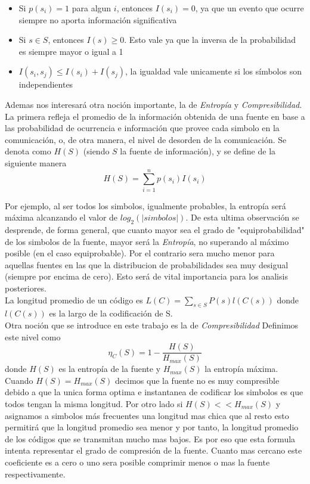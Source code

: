 \begin{itemize}
	\item Si $p(s_i) = 1$ para algun $i$, entonces $I(s_i) = 0$, ya que un evento que ocurre siempre no aporta información significativa
	\item Si $s \in S$, entonces $I(s) \geq 0$. Esto vale ya que la inversa de la probabilidad es siempre mayor o igual a 1
	\item $I(s_i, s_j) \leq I(s_i) + I(s_j)$, la igualdad vale unicamente si los símbolos son independientes
	
\end{itemize}

Ademas nos interesará otra noción importante, la de \textit{Entropía} y \textit{Compresibilidad}. La
primera refleja el promedio de la información obtenida de una fuente en
base a las probabilidad de ocurrencia e información que provee cada simbolo en la
comunicación, o, de otra manera, el nivel de desorden de la comunicación.
Se denota como $H(S)$ (siendo $S$ la fuente de información), y se
define de la siguiente manera 
\begin{equation}
	H(S) = \sum\limits_{i=1}^n p(s_i)I(s_i)
\end{equation}

Por ejemplo, al ser todos los simbolos, igualmente probables,
la entropía será máxima alcanzando el valor de $log_2(\lvert simbolos\rvert)$.
De esta ultima observación se desprende, de forma general, que cuanto mayor sea el grado de
"equiprobabilidad" de los simbolos de la fuente, mayor será la
\textit{Entropía}, no superando al máximo posible (en el caso equiprobable).
Por el contrario sera mucho menor para aquellas fuentes en las
que la distribucion de probabilidades sea muy desigual (siempre por encima de cero).
Esto será de vital importancia para los analisis posteriores.
\\

La longitud promedio de un código es $L(C) = \sum_{s \in S} P(s)l(C(s))$ donde
$l(C(s))$ es la largo de la codificación de S.
\\

Otra noción que se introduce en este trabajo es la de \textit{Compresibilidad}
Definimos este nivel como
\begin{equation}
\eta_{C}(S)=1-\frac{H(S)}{H_{max}(S)}
\end{equation}donde $H(S)$ es la entropía de la
fuente y $H_{max}(S)$ la entropía máxima. Cuando $H(S) = H_{max}(S)$ decimos que
la fuente no es muy compresible debido a que la unica forma optima e instantanea
de codificar los simbolos es que todos tengan la misma longitud. Por otro lado
si $H(S) << H_{max}(S)$ y asignamos a simbolos más frecuentes
una longitud mas chica que al resto esto permitirá que la longitud promedio
sea menor y por tanto, la longitud promedio de los códigos que se transmitan
mucho mas bajos.
Es por eso que esta formula intenta representar el grado de compresión de la fuente.
Cuanto mas cercano este coeficiente es a cero o uno sera posible comprimir menos
o mas la fuente respectivamente.


